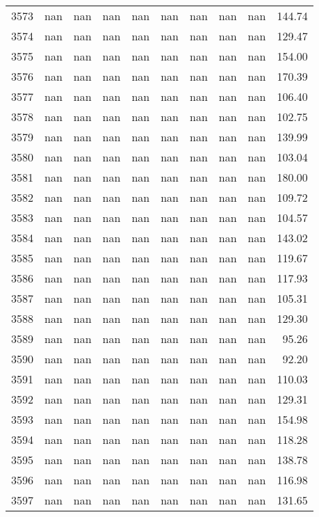 \begin{tabular}{lrrrrrrrrr}
3573 & nan & nan & nan & nan & nan & nan & nan & nan & 144.74 \\
3574 & nan & nan & nan & nan & nan & nan & nan & nan & 129.47 \\
3575 & nan & nan & nan & nan & nan & nan & nan & nan & 154.00 \\
3576 & nan & nan & nan & nan & nan & nan & nan & nan & 170.39 \\
3577 & nan & nan & nan & nan & nan & nan & nan & nan & 106.40 \\
3578 & nan & nan & nan & nan & nan & nan & nan & nan & 102.75 \\
3579 & nan & nan & nan & nan & nan & nan & nan & nan & 139.99 \\
3580 & nan & nan & nan & nan & nan & nan & nan & nan & 103.04 \\
3581 & nan & nan & nan & nan & nan & nan & nan & nan & 180.00 \\
3582 & nan & nan & nan & nan & nan & nan & nan & nan & 109.72 \\
3583 & nan & nan & nan & nan & nan & nan & nan & nan & 104.57 \\
3584 & nan & nan & nan & nan & nan & nan & nan & nan & 143.02 \\
3585 & nan & nan & nan & nan & nan & nan & nan & nan & 119.67 \\
3586 & nan & nan & nan & nan & nan & nan & nan & nan & 117.93 \\
3587 & nan & nan & nan & nan & nan & nan & nan & nan & 105.31 \\
3588 & nan & nan & nan & nan & nan & nan & nan & nan & 129.30 \\
3589 & nan & nan & nan & nan & nan & nan & nan & nan & 95.26 \\
3590 & nan & nan & nan & nan & nan & nan & nan & nan & 92.20 \\
3591 & nan & nan & nan & nan & nan & nan & nan & nan & 110.03 \\
3592 & nan & nan & nan & nan & nan & nan & nan & nan & 129.31 \\
3593 & nan & nan & nan & nan & nan & nan & nan & nan & 154.98 \\
3594 & nan & nan & nan & nan & nan & nan & nan & nan & 118.28 \\
3595 & nan & nan & nan & nan & nan & nan & nan & nan & 138.78 \\
3596 & nan & nan & nan & nan & nan & nan & nan & nan & 116.98 \\
3597 & nan & nan & nan & nan & nan & nan & nan & nan & 131.65 \\

\end{tabular}
